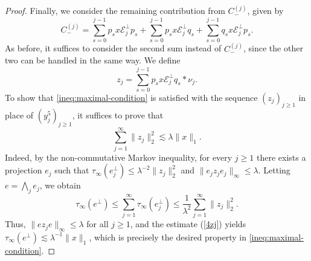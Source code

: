 \documentclass[12pt]{amsart}
\theoremstyle{remark}
\theoremstyle{definition}
\numberwithin{equation}{section}
\begin{document}
\begin{proof}
Finally, we consider the remaining contribution from $C_-^{(j)}$, given by
\[
C_-^{(j)} = \sum_{s=0}^{j-1} p_s x\mathcal{E}_j^\perp p_s + 
\sum_{s=0}^{j-1} p_s x\mathcal{E}_j^\perp q_s + 
\sum_{s=0}^{j-1} q_s x\mathcal{E}_j^\perp p_s.
\]
As before, it suffices to consider the second sum instead of $C^{(j)}_{-}$, since the other two can be handled in the same way. We define
\[
z_j = \sum_{s=0}^{j-1} p_s x\mathcal{E}_j^\perp q_s \ast \nu_j.
\]
To show that \eqref{ineq:maximal-condition} is satisfied with
the sequence $(z_j)_{j\ge1}$ in place of $(y^5_j)_{j\geq 1}$,
it suffices to prove that
\begin{equation}\label{4zj}
\sum_{j=1}^{\infty}\|z_j\|_2^2 \lesssim \lambda\|x\|_1.
\end{equation}
Indeed, by the non-commutative Markov inequality, 
for every $j\geq 1$ there exists a projection $e_j$ such that $\tau_\infty (e_j^\perp)\leq
\lambda^{-2}\|z_j\|_2^2$ and $\|e_j z_j e_j\|_\infty \leq \lambda$. 
Letting $e = \bigwedge_j e_j$, we obtain
\[
\tau_\infty(e^\perp) \leq \sum_{j=1}^\infty 
\tau_\infty(e_j^\perp) \leq \frac{1}{\lambda^2}
\sum_{j=1}^\infty \|z_j\|_2^2.
\]
Thus, $\|e z_j e\|_\infty \leq \lambda$ for all 
$j \ge 1$, and the estimate (\ref{4zj}) yields
$\tau_\infty(e^\perp) \lesssim \lambda^{-1}\|x\|_1$, 
which is precisely the desired property in \eqref{ineq:maximal-condition}.




\end{proof}
\end{document}
